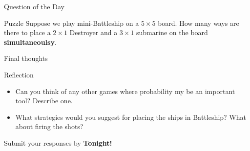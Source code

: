 \documentclass{beamer}
\begin{document}
\begin{frame}{Question of the Day}
\pause
  \begin{block}{Puzzle}
    Suppose we play mini-Battleship on a $5\times 5$ board.
    How many ways are there to place a $2\times 1$ Destroyer and a $3\times 1$ submarine on the board \textbf{simultaneoulsy}.
  \end{block}
\end{frame}

\begin{frame}{Final thoughts}
  \begin{block}{Reflection}
    \begin{itemize}
\pause
      \item Can you think of any other games where probability my be an important tool?  Describe one.
\pause
      \item What strategies would you suggest for placing the ships in Battleship?  What about firing the shots?
    \end{itemize}
  \end{block}
\begin{center}
Submit your responses by \textbf{Tonight!}
\end{center}
\end{frame}
\end{document}
